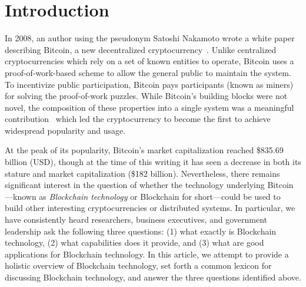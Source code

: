 
\section{Introduction}

In 2008, an author using the pseudonym Satoshi Nakamoto wrote a white paper describing Bitcoin, a new decentralized cryptocurrency~\cite{Nak08}.
Unlike centralized cryptocurrencies which rely on a set of known entities to operate, Bitcoin uses a proof-of-work-based scheme to allow the general public to maintain the system.%
To incentivize public participation, Bitcoin pays participants (known as miners) for solving the proof-of-work puzzles.
While Bitcoin's building blocks were not novel, the composition of these properties into a single system was a meaningful contribution~\cite{Narayanan17} which led the cryptocurrency to become the first to achieve widespread popularity and usage.

At the peak of its popularity, Bitcoin's market capitalization reached \$835.69 billion (USD), though at the time of this writing it has seen a decrease in both its stature and market capitalization (\$182 billion).
Nevertheless, there remains significant interest in the question of whether the technology underlying Bitcoin---known as \emph{Blockchain technology} or {Blockchain} for short---could be used to build other interesting cryptocurrencies or distributed systems.
In particular, we have consistently heard researchers, business executives, and government leadership ask the following three questions: (1) what exactly is Blockchain technology, (2) what capabilities does it provide, and (3) what are good applications for Blockchain technology.%
%
In this article, 
we attempt to provide a holistic overview of Blockchain technology, set forth a common lexicon for discussing Blockchain technology, and answer the three questions identified above.

